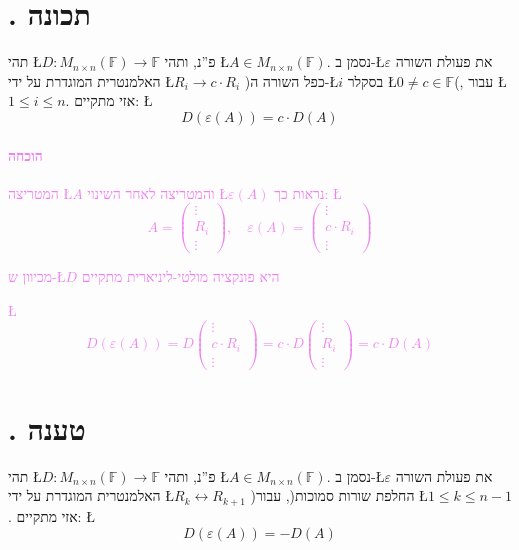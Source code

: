\documentclass[english,hebrew]{article}
\begin{document}
\section{{\endL}. תכונה}

תהי \L{$D\colon M_{n\times n}(\mathbb{F})\to\mathbb{F}$} פ\textquotedblright נ,
ותהי \L{$A\in M_{n\times n}(\mathbb{F})$}. נסמן ב-\L{$\varepsilon$}
את פעולת השורה האלמנטרית המוגדרת על ידי \L{$R_{i}\to c\cdot R_{i}$}
)כפל השורה ה-\L{$i$} בסקלר \L{$0\neq c\in\mathbb{F}$}(, עבור \L{$1\le i\le n$}.
אזי מתקיים: \L{%
\[
D(\varepsilon(A))=c\cdot D(A)
\]
}%

\paragraph{\textcolor{violet}{הוכחה}}

\textcolor{violet}{המטריצה \L{$A$} והמטריצה לאחר השינוי \L{$\varepsilon(A)$}
נראות כך: \L{%
\[
A=\begin{pmatrix}\vdots\\
R_{i}\\
\vdots
\end{pmatrix},\quad\varepsilon(A)=\begin{pmatrix}\vdots\\
c\cdot R_{i}\\
\vdots
\end{pmatrix}
\]
}%
}

\textcolor{violet}{מכיוון ש-\L{$D$} היא פונקציה מולטי-ליניארית מתקיים}

\textcolor{violet}{\L{%
\[
D(\varepsilon(A))=D\begin{pmatrix}\vdots\\
c\cdot R_{i}\\
\vdots
\end{pmatrix}=c\cdot D\begin{pmatrix}\vdots\\
R_{i}\\
\vdots
\end{pmatrix}=c\cdot D(A)
\]
}%
}

\section{{\endL}. טענה}

תהי \L{$D\colon M_{n\times n}(\mathbb{F})\to\mathbb{F}$} פ\textquotedblright נ,
ותהי \L{$A\in M_{n\times n}(\mathbb{F})$}. נסמן ב-\L{$\varepsilon$}
את פעולת השורה האלמנטרית המוגדרת על ידי \L{$R_{k}\leftrightarrow R_{k+1}$}
)החלפת שורות סמוכות(, עבור \L{$1\le k\le n-1$}. אזי מתקיים: \L{%
\[
D(\varepsilon(A))=-D(A)
\]
}%
\end{document}
